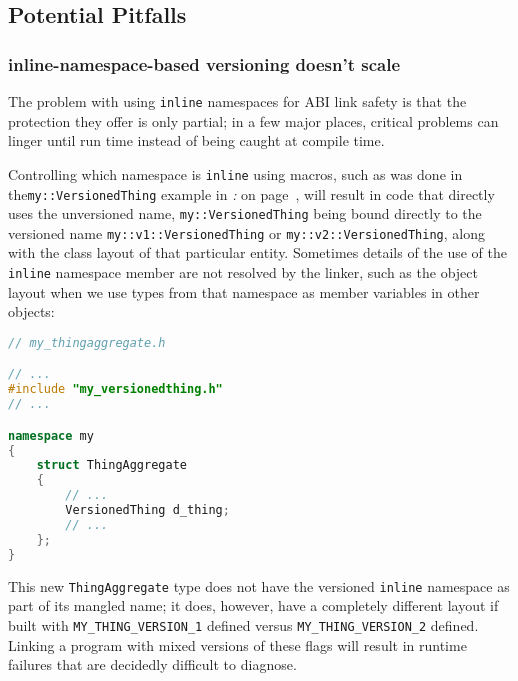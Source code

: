 \subsection[Potential Pitfalls]{Potential Pitfalls}\label{potential-pitfalls-inlinenamespace}

\subsubsection[{\tt inline}-namespace-based versioning doesn’t scale]{{\SubsubsecCode inline}-namespace-based versioning doesn’t scale}\label{inline-namespace-based-versioning-doesn’t-scale}

The problem with using \texttt{inline} namespaces for ABI link safety is
that the protection they offer is only partial; in a few major places,
critical problems can linger until run time instead of being caught at
compile time.

Controlling which namespace is \texttt{inline} using macros, such as was
done in the\linebreak[4] \texttt{my::VersionedThing} example in \textit{: } on page~\pageref{link-safe-abi-versioning}, will result in code that
directly uses the unversioned name, \texttt{my::VersionedThing} being
bound directly to the versioned name \texttt{my::v1::VersionedThing} or
\texttt{my::v2::VersionedThing}, along with the class layout of that
particular entity. Sometimes details of the use of the \texttt{inline}
namespace member are not resolved by the linker, such as the object
layout when we use types from that namespace as member variables in
other objects:

\begin{lstlisting}[language=C++]
// my_thingaggregate.h

// ...
#include "my_versionedthing.h"
// ...

namespace my
{
    struct ThingAggregate
    {
        // ...
        VersionedThing d_thing;
        // ...
    };
}
\end{lstlisting}

\noindent This new \texttt{ThingAggregate} type does not have the versioned
\texttt{inline} namespace as part of its mangled name; it does, however,
have a completely different layout if built with
\texttt{MY\_THING\_VERSION\_1} defined
versus \texttt{MY\_THING\_VERSION\_2} defined. Linking a program with mixed
versions of these flags will result in runtime failures that are
decidedly difficult to diagnose.

